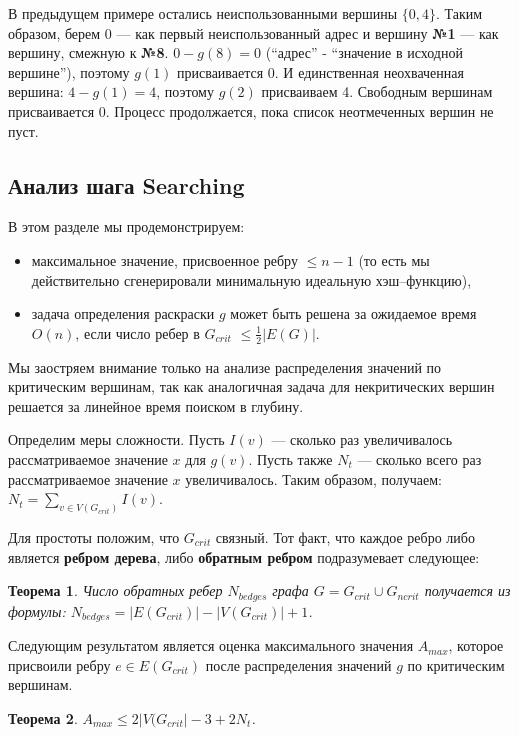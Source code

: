 \documentclass[specialist,
               substylefile = spbu.rtx,
               subf,href,colorlinks=true, 12pt]{disser}
\newtheorem{myth}{Теорема}
\begin{document}
В предыдущем примере остались неиспользованными вершины $\{0,4\}$. Таким образом, берем 0 --- как первый неиспользованный адрес и вершину \textbf{№1} --- как вершину, смежную к \textbf{№8}. $0 - g(8) = 0$ (``адрес'' - ``значение в исходной вершине''), поэтому $g(1)$ присваивается 0. И единственная неохваченная вершина: $4 - g(1) = 4$, поэтому $g(2)$ присваиваем 4. Свободным вершинам присваивается 0. Процесс продолжается, пока список неотмеченных вершин не пуст.

\subsection{Анализ шага Searching}
В этом разделе мы продемонстрируем:
\begin{itemize}
\item максимальное значение, присвоенное ребру $\leq n - 1$ (то есть мы действительно сгенерировали минимальную идеальную хэш--функцию),
\item задача определения раскраски $g$ может быть решена за ожидаемое время $\mathit{O}(n)$, если число ребер в $G_{crit}$ $\leq \frac{1}{2}|E(G)|$. 
\end{itemize}

Мы заостряем внимание только на анализе распределения значений по критическим вершинам, так как аналогичная задача для некритических вершин решается за линейное время поиском в глубину.

Определим меры сложности. Пусть $I(v)$ --- сколько раз увеличивалось рассматриваемое значение $x$ для $g(v)$. Пусть также $N_{t}$ --- сколько всего раз рассматриваемое значение $x$ увеличивалось. Таким образом, получаем: $N_{t} = \sum \limits_{v \in V(G_{crit})} I(v)$.

Для простоты положим, что $G_{crit}$ связный. Тот факт, что каждое ребро либо является \textbf{ребром дерева}, либо \textbf{обратным ребром} подразумевает следующее:
\begin{myth}\label{th1}
Число обратных ребер $N_{bedges}$ графа $G = G_{crit} \cup G_{ncrit}$ получается из формулы: $N_{bedges} = |E(G_{crit})| - |V(G_{crit})| + 1$.
\end{myth}

Следующим результатом является оценка максимального значения $A_{max}$, которое присвоили ребру $e \in E(G_{crit})$ после распределения значений $g$ по критическим вершинам. 

\begin{myth}\label{th2}
$A_{max} \leq 2|V(G_{crit}| - 3 + 2N_{t}$.
\end{myth}
\end{document}
